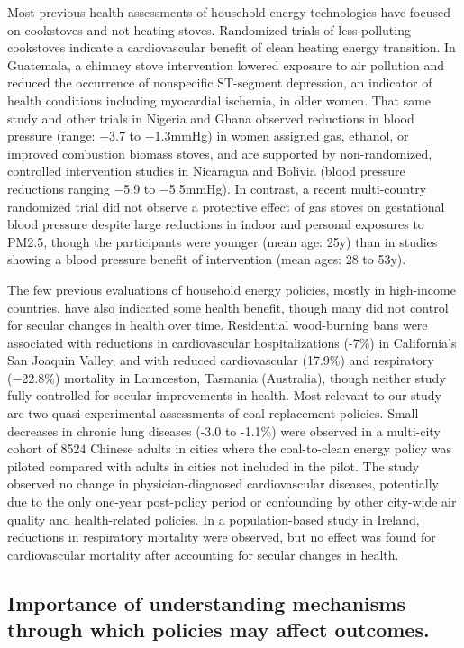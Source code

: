 \documentclass[
  letterpaper,
  DIV=11,
  numbers=noendperiod]{scrartcl}
\begin{document}
Most previous health assessments of household energy technologies have
focused on cookstoves and not heating stoves. Randomized trials of less
polluting cookstoves indicate a cardiovascular benefit of clean heating
energy transition. In Guatemala, a chimney stove intervention lowered
exposure to air pollution and reduced the occurrence of nonspecific
ST-segment depression, an indicator of health conditions including
myocardial ischemia, in older women. That same study and other trials in
Nigeria and Ghana observed reductions in blood pressure (range: −3.7 to
−1.3mmHg) in women assigned gas, ethanol, or improved combustion biomass
stoves, and are supported by non-randomized, controlled intervention
studies in Nicaragua and Bolivia (blood pressure reductions ranging −5.9
to −5.5mmHg). In contrast, a recent multi-country randomized trial did
not observe a protective effect of gas stoves on gestational blood
pressure despite large reductions in indoor and personal exposures to
PM2.5, though the participants were younger (mean age: 25y) than in
studies showing a blood pressure benefit of intervention (mean ages: 28
to 53y).

The few previous evaluations of household energy policies, mostly in
high-income countries, have also indicated some health benefit, though
many did not control for secular changes in health over time.
Residential wood-burning bans were associated with reductions in
cardiovascular hospitalizations (-7\%) in California's San Joaquin
Valley, and with reduced cardiovascular (17.9\%) and respiratory
(−22.8\%) mortality in Launceston, Tasmania (Australia), though neither
study fully controlled for secular improvements in health. Most relevant
to our study are two quasi-experimental assessments of coal replacement
policies. Small decreases in chronic lung diseases (-3.0 to -1.1\%) were
observed in a multi-city cohort of 8524 Chinese adults in cities where
the coal-to-clean energy policy was piloted compared with adults in
cities not included in the pilot. The study observed no change in
physician-diagnosed cardiovascular diseases, potentially due to the only
one-year post-policy period or confounding by other city-wide air
quality and health-related policies. In a population-based study in
Ireland, reductions in respiratory mortality were observed, but no
effect was found for cardiovascular mortality after accounting for
secular changes in health.

\subsection{Importance of understanding mechanisms through which
policies may affect
outcomes.}\label{importance-of-understanding-mechanisms-through-which-policies-may-affect-outcomes.}
\end{document}
